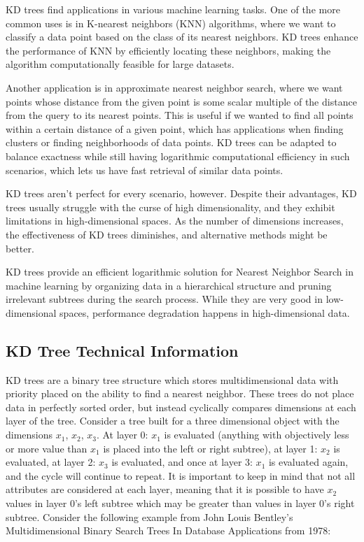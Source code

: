 \documentclass{article}
\begin{document}
KD trees find applications in various machine learning tasks. One of the more common uses is in K-nearest neighbors (KNN) algorithms, where we want to classify a data point based on the class of its nearest neighbors. KD trees enhance the performance of KNN by efficiently locating these neighbors, making the algorithm computationally feasible for large datasets.

Another application is in approximate nearest neighbor search, where we want points whose distance from the given point is some scalar multiple of the distance from the query to its nearest points. This is useful if we wanted to find all points within a certain distance of a given point, which has applications when finding clusters or finding neighborhoods of data points. KD trees can be adapted to balance exactness while still having logarithmic computational efficiency in such scenarios, which lets us have fast retrieval of similar data points.

KD trees aren't perfect for every scenario, however. Despite their advantages, KD trees usually struggle with the curse of high dimensionality, and they exhibit limitations in high-dimensional spaces. As the number of dimensions increases, the effectiveness of KD trees diminishes, and alternative methods might be better.

KD trees provide an efficient logarithmic solution for Nearest Neighbor Search in machine learning by organizing data in a hierarchical structure and pruning irrelevant subtrees during the search process. While they are very good in low-dimensional spaces, performance degradation happens in high-dimensional data.

    \subsection*{KD Tree Technical Information}
KD trees are a binary tree structure which stores multidimensional data with priority placed on the ability to find a nearest neighbor. These trees do not place data in perfectly sorted order, but instead cyclically compares dimensions at each layer of the tree. Consider a tree built for a three dimensional object with the dimensions $x_1$, $x_2$, $x_3$. At layer 0: $x_1$ is evaluated (anything with objectively less or more value than $x_1$ is placed into the left or right subtree), at layer 1: $x_2$ is evaluated, at layer 2: $x_3$ is evaluated, and once at layer 3: $x_1$ is evaluated again, and the cycle will continue to repeat. It is important to keep in mind that not all attributes are considered at each layer, meaning that it is possible to have $x_2$ values in layer 0’s left subtree which may be greater than values in layer 0’s right subtree. Consider the following example from John Louis Bentley’s Multidimensional Binary Search Trees In Database Applications from 1978:
\end{document}
